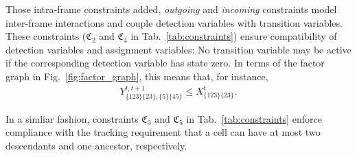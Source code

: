 \documentclass[10pt,twocolumn,letterpaper]{article}
\begin{document}
Those intra-frame constraints added, \emph{outgoing} and \emph{incoming} constraints model inter-frame interactions
and couple detection variables with transition variables.
These constraints ($\mathfrak{C}_2$ and $\mathfrak{C}_4$ in Tab.~\ref{tab:constraints})
ensure compatibility of detection variables and assignment variables: No transition variable may be active
if the corresponding detection variable has state zero. 
In terms of the factor graph in
Fig.~\ref{fig:factor_graph}, this means that, for instance,
\begin{align}
 Y_{\{123\}\{23\},\{5\}\{45\}}^{t,t+1} \leq X_{\{123\}\{23\}}^t.
\end{align}


In a simliar fashion, constraints $\mathfrak{C}_3$ and $\mathfrak{C}_5$ in Tab.~\ref{tab:constraints} enforce compliance
with the tracking requirement that a cell can have at most two descendants and one ancestor, respectively.
\end{document}
